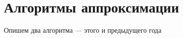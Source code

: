 \chapter{Алгоритмы аппроксимации}
\label{ch:algrhtms}

Опишем два алгоритма --- этого и предыдущего года